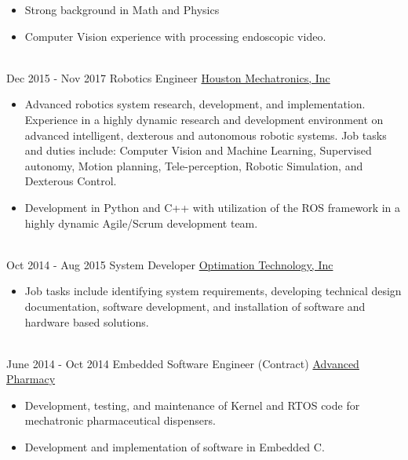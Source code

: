 \documentclass[letterpaper]{twentysecondcv} %
\begin{document}
\begin{twenty}
{\begin{itemize}
			\item Strong background in Math and Physics
			\item Computer Vision experience with processing endoscopic video. 
		\end{itemize}}
		\\
		\twentyitem
		{Dec 2015 -}
		{Nov 2017}
		{Robotics Engineer}
		{\href{https://houstonmechatronics.com/}{Houston Mechatronics, Inc}}
		{}
		{
			{\begin{itemize}
					\item Advanced robotics system research, development, and implementation. Experience in a highly dynamic research and development environment on advanced intelligent, dexterous and autonomous robotic systems. Job tasks and duties include: Computer Vision and Machine Learning, Supervised autonomy, Motion planning, Tele-perception, Robotic Simulation, and Dexterous Control. 
					\item Development in Python and C++ with utilization of the ROS framework in a highly dynamic Agile/Scrum development team.
				\end{itemize}}
			}
			\\   
			\twentyitem
			{Oct 2014 -}
			{Aug 2015}
			{System Developer}
			{\href{http://optimation.us/}{Optimation Technology, Inc}}
			{}
			{
				{\begin{itemize}
						\item Job tasks include identifying system requirements, developing technical design documentation, software development, and installation of software and hardware based solutions.
					\end{itemize}}
				}
				\\
				\twentyitem
				{June 2014 -}
				{Oct 2014}
				{Embedded Software Engineer (Contract)}
				{\href{https://www.advancedpharmacy.com/}{Advanced Pharmacy}}
				{}
				{
					\begin{itemize}
						\item Development, testing, and maintenance of Kernel and RTOS code for mechatronic pharmaceutical dispensers.
						\item Development and implementation of software in Embedded C. 
						
					\end{itemize}
				}
				

\end{twenty}
\end{document}
